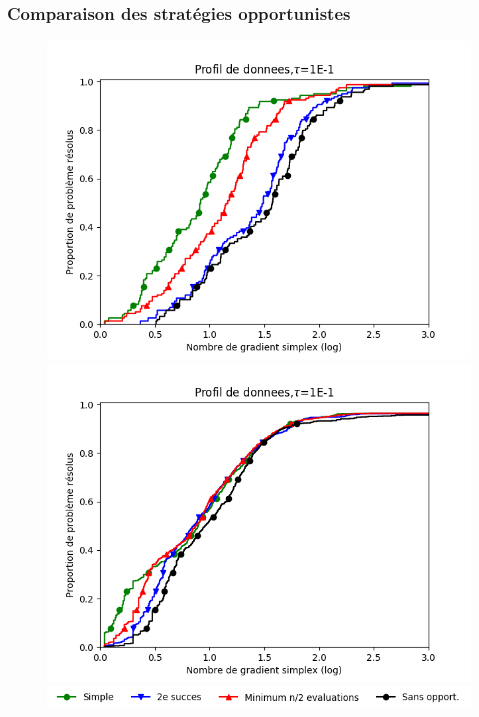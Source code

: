\documentclass{beamer}
\begin{document}
\begin{frame}
\frametitle{Comparaison des stratégies opportunistes}
\noindent
\begin{center}
\begin{figure}
\vspace{-1em}
\begin{minipage}[t]{0.5\linewidth}
\includegraphics[width=\linewidth]{coppcomp.png}
\end{minipage}%
\hfill%
\begin{minipage}[t]{0.5\linewidth}
\includegraphics[width=\linewidth]{moppcomp.png}
\end{minipage}
\includegraphics[width=\linewidth]{Legende_comp.png}

\end{figure}
\end{center}
\end{frame}
\end{document}
